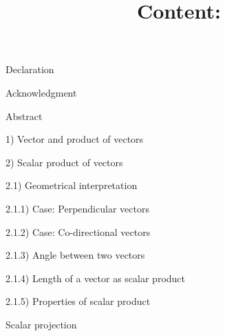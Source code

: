 \documentclass[11pt]{article}
\makeatletter
\def\NormalBaseline{\def\baselinestretch{1.1}}
\def\@shorttitle{\@empty}
\def\shorttitle#1{\gdef\@shorttitle{#1}}
\makeatother
\begin{document}
\renewcommand*\rmdefault{bch}\normalfont\upshape




\shorttitle{}

\date{}  

  
\title{\NormalBaseline\raggedright\bfseries \textbf{Content:}\\\vspace{.2cm}















\vspace{-3em}}  
      	\def\AuAffLabelStyle#1{\textsuperscript{\upshape#1}}
        \def\AuFont{\bfseries\large}
        \def\AuSep{, }
        \def\AffSep{\\}
        \let\origthanks\thanks
\renewcommand\thanks[1]{\begingroup\let\rlap\relax\origthanks{#1}\endgroup}
\author{\hskip2pc\parbox{.95\linewidth}{\AuFont 
    }}
    
    
\maketitle 
\pagestyle{custom}


\LARGE
Declaration


Acknowledgment


Abstract


1) Vector and product of vectors


2) Scalar product of vectors


\hspace{1cm}2.1) Geometrical interpretation 


\hspace{2.2cm}2.1.1) Case: Perpendicular vectors


\hspace{2.2cm}2.1.2) Case: Co-directional vectors


\hspace{2.2cm}2.1.3) Angle between two vectors


\hspace{2.2cm}2.1.4) Length of a vector as scalar product


\hspace{2.2cm}2.1.5) Properties of scalar product


\hspace{3.8cm} Scalar projection
\end{document}
